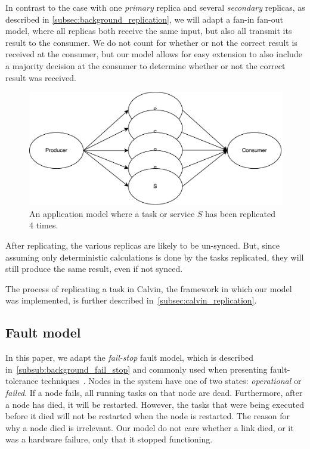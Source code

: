 \documentclass{cslthse-msc}
\begin{document}
In contrast to the case with one \emph{primary} replica and several \emph{secondary} replicas, as described in \cref{subsec:background_replication}, we will adapt a fan-in fan-out model, where all replicas both receive the same input, but also all transmit its result to the consumer. We do not count for whether or not the correct result is received at the consumer, but our model allows for easy extension to also include a majority decision at the consumer to determine whether or not the correct result was received. %

\begin{figure}[!hbt]
\centering
\includegraphics[scale=0.5]{images/app_model_replication.pdf} 
\caption{An application model where a task or service $S$ has been replicated 4 times.}\label{fig:app_model_replication}
\end{figure}

After replicating, the various replicas are likely to be un-synced. But, since assuming only deterministic calculations is done by the tasks replicated, they will still produce the same result, even if not synced.

The process of replicating a task in Calvin, the framework in which our model was implemented, is further described in~\cref{subsec:calvin_replication}.

\subsection{Fault model} \label{subsec:design_fault_model}
In this paper, we adapt the \emph{fail-stop} fault model, which is described in~\cref{subsub:background_fail_stop} and commonly used when presenting fault-tolerance techniques~\cite{surveyFaultParallel}. Nodes in the system have one of two states: \emph{operational} or \emph{failed}. If a node fails, all running tasks on that node are dead. Furthermore, after a node has died, it will be restarted. However, the tasks that were being executed before it died will not be restarted when the node is restarted. The reason for why a node died is irrelevant. Our model do not care whether a link died, or it was a hardware failure, only that it stopped functioning.
\end{document}
